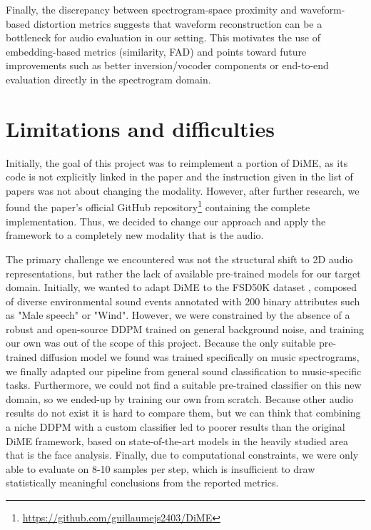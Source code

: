 \documentclass[11pt]{article}
\begin{document}
Finally, the discrepancy between spectrogram-space proximity and waveform-based
distortion metrics suggests that waveform reconstruction can be a bottleneck for
audio evaluation in our setting. This motivates the use of embedding-based
metrics (similarity, FAD) and points toward future improvements such as
better inversion/vocoder components or end-to-end evaluation directly in the
spectrogram domain.

\section{Limitations and difficulties}

Initially, the goal of this project was to reimplement a portion of
DiME, as its code is not explicitly linked in the paper and the
instruction given in the list of papers was not about changing the
modality. However, after further research, we found the paper's
official GitHub
repository\footnote{\url{https://github.com/guillaumejs2403/DiME}}
containing the complete implementation. Thus, we decided to change
our approach and apply the framework to a completely new modality
that is the audio.

The primary challenge we encountered was not the structural shift to
2D audio representations, but rather the lack of available
pre-trained models for our target domain. Initially, we wanted to
adapt DiME to the FSD50K dataset \cite{fonseca2022FSD50K}, composed
of diverse environmental sound events annotated with 200 binary
attributes such as "Male speech" or "Wind". However, we were
constrained by the absence of a robust and open-source DDPM trained
on general background noise, and training our own was out of the
scope of this project. Because the only suitable pre-trained
diffusion model we found was trained specifically on music
spectrograms, we finally adapted our pipeline from general sound
classification to music-specific tasks. Furthermore, we could not
find a suitable pre-trained classifier on this new domain, so we
ended-up by training our own from scratch. Because other audio
results do not exist it is hard to compare them, but we can think
that combining a niche DDPM with a custom classifier led to poorer
results than the original DiME framework, based on state-of-the-art
models in the heavily studied area that is the face analysis.
Finally, due to computational constraints, we were only able to
evaluate on 8-10 samples per step, which is insufficient to draw
statistically meaningful conclusions from the reported metrics.

\newpage
\printbibliography
\end{document}
